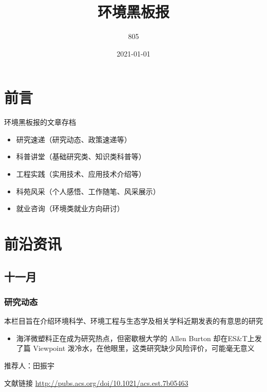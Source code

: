 \documentclass[
]{book}
\title{环境黑板报}
\author{805}
\date{2021-01-01}
\providecommand{\tightlist}{%
  \setlength{\itemsep}{0pt}\setlength{\parskip}{0pt}}
\begin{document}
\maketitle

{
\setcounter{tocdepth}{1}
\tableofcontents
}
\hypertarget{ux524dux8a00}{%
\chapter{前言}\label{ux524dux8a00}}

环境黑板报的文章存档

\begin{itemize}
\item
  研究速递（研究动态、政策速递等）
\item
  科普讲堂（基础研究类、知识类科普等）
\item
  工程实践（实用技术、应用技术介绍等）
\item
  科苑风采（个人感悟、工作随笔、风采展示）
\item
  就业咨询（环境类就业方向研讨）
\end{itemize}

\hypertarget{news}{%
\chapter{前沿资讯}\label{news}}

\hypertarget{ux5341ux4e00ux6708}{%
\section*{十一月}\label{ux5341ux4e00ux6708}}

\hypertarget{ux7814ux7a76ux52a8ux6001}{%
\subsection*{研究动态}\label{ux7814ux7a76ux52a8ux6001}}

本栏目旨在介绍环境科学、环境工程与生态学及相关学科近期发表的有意思的研究

\begin{itemize}
\tightlist
\item
  海洋微塑料正在成为研究热点，但密歇根大学的 Allen Burton 却在ES\&T上发了篇 Viewpoint 泼冷水，在他眼里，这类研究缺少风险评价，可能毫无意义
\end{itemize}

推荐人：田振宇

文献链接 \url{http://pubs.acs.org/doi/10.1021/acs.est.7b05463}
\end{document}
